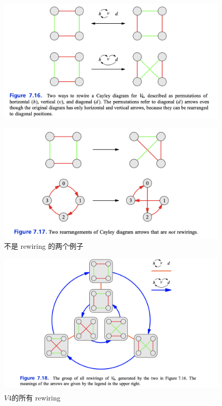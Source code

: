 \documentclass[12pt]{article}
\begin{document}
\begin{figure}[H]
    \centering
    \includegraphics[width=1\textwidth]{fig/Group/Cayley-V4-rewiring.png}
\end{figure}
\begin{figure}[H]
    \centering
    \includegraphics[width=1\textwidth]{fig/Group/Cayley-not-rewiring.png}
        \caption*{不是 rewiring 的两个例子}
\end{figure}
\begin{figure}[H]
    \centering
    \includegraphics[width=1\textwidth]{fig/Group/Cayley-V4-all-rewiring.png}
     \caption*{$V4$的所有 rewiring}
\end{figure}
\end{document}
